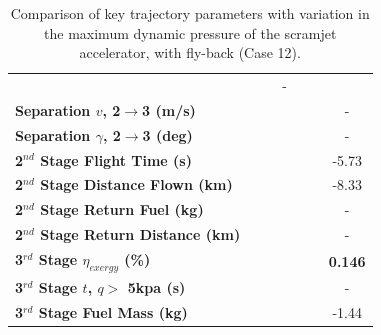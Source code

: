 \begin{table}[ht]
\begin{tabular}{l c c c c c c}
			& \secondthirdSeparationAltqFiftyFive
			& \secondthirdSeparationAltqSixty
			& -
			\\
			\textbf{Separation $v$, 2$\rightarrow$3 (m/s)}
			& \secondthirdSeparationvqForty
			& \secondthirdSeparationvqFortyFive
			& \secondthirdSeparationvqStandard
			& \secondthirdSeparationvqFiftyFive
			& \secondthirdSeparationvqSixty
			& -
			\\
			\textbf{Separation $\gamma$, 2$\rightarrow$3 (deg)}
			& \secondthirdSeparationgammaqForty
			& \secondthirdSeparationgammaqFortyFive
			& \secondthirdSeparationgammaqStandard
			& \secondthirdSeparationgammaqFiftyFive
			& \secondthirdSeparationgammaqSixty
			& -
			\\
			\textbf{2$^{nd}$ Stage Flight Time (s)}
			& \secondFlightTimeqForty
			& \secondFlightTimeqFortyFive
			& \secondFlightTimeqStandard
			& \secondFlightTimeqFiftyFive
			& \secondFlightTimeqSixty
			&-5.73
			\\
			\textbf{2$^{nd}$ Stage Distance Flown (km)}
			& \SecondDistqForty
			& \SecondDistqFortyFive
			& \SecondDistqStandard
			& \SecondDistqFiftyFive
			& \SecondDistqSixty
			&-8.33
			\\
			\textbf{2$^{nd}$ Stage Return Fuel (kg)}
			& \returnFuelqForty
			& \returnFuelqFortyFive
			& \returnFuelqStandard
			& \returnFuelqFiftyFive
			& \returnFuelqSixty
			& -
			\\
			\textbf{2$^{nd}$ Stage Return Distance (km)}
			& \returnDistqForty
			& \returnDistqFortyFive
			& \returnDistqStandard
			& \returnDistqFiftyFive
			& \returnDistqSixty
			& -
			\\
			\hline 
			\textbf{3$^{rd}$ Stage $\eta_{exergy}$ (\%)}
			& \textbf{\thirddExergyEffqForty}
			& \textbf{\thirddExergyEffqFortyFive}
			& \textbf{\thirddExergyEffqStandard}
			& \textbf{\thirddExergyEffqFiftyFive}
			& \textbf{\thirddExergyEffqSixty}
			& \textbf{0.146}
			\\
			\textbf{3$^{rd}$ Stage $t$, $q >$ 5kpa (s)}
			& \thirdqOverFiveqForty
			& \thirdqOverFiveqFortyFive
			& \thirdqOverFiveqStandard
			& \thirdqOverFiveqFiftyFive
			& \thirdqOverFiveqSixty
			& -
			\\
			\textbf{3$^{rd}$ Stage Fuel Mass (kg)}
			& \thirdmFuelqForty
			& \thirdmFuelqFortyFive
			& \thirdmFuelqStandard
			& \thirdmFuelqFiftyFive
			& \thirdmFuelqSixty
			&-1.44
			\\
			\hline 
		\end{tabular} 
	\caption{Comparison of key trajectory parameters with variation in the maximum dynamic pressure of the scramjet accelerator, with fly-back (Case 12).}
	\label{tab:qvarreturn}
\end{table}

